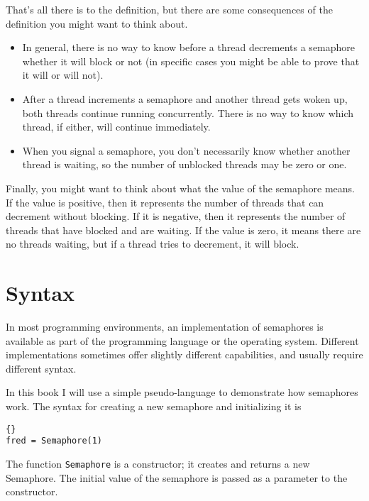 \documentclass{book}
\begin{document}
That's all there is to the definition, but there are some
consequences of the definition you might want to think about.

\begin{itemize}

\item In general, there is no way to know before a thread decrements a
semaphore whether it will block or not (in specific cases you might
be able to prove that it will or will not).

\item After a thread increments a semaphore and another thread gets
woken up, both threads continue running concurrently.  There is no way
to know which thread, if either, will continue immediately.

\item When you signal a semaphore, you don't necessarily know whether
another thread is waiting, so the number of unblocked threads may
be zero or one.

\end{itemize}

Finally, you might want to think about what the value of the
semaphore means.  If the value is positive, then it represents the
number of threads that can decrement without blocking.  If it
is negative, then it represents the number of threads that have
blocked and are waiting.  If the value is zero, it means there
are no threads waiting, but if a thread tries to decrement, it
will block.


\section{Syntax}

In most programming environments, an implementation of semaphores is
available as part of the programming language or the operating system.
Different implementations sometimes offer slightly different
capabilities, and usually require different syntax.

In this book I will use a simple pseudo-language to demonstrate
how semaphores work.  The syntax for creating a new semaphore
and initializing it is
%
\begin{lstlisting}[title={Semaphore initialization syntax}]{}
fred = Semaphore(1)
\end{lstlisting}
%
The function {\tt Semaphore} is a constructor; it creates and
returns a new Semaphore.  The initial value of the semaphore
is passed as a parameter to the constructor.
\end{document}
